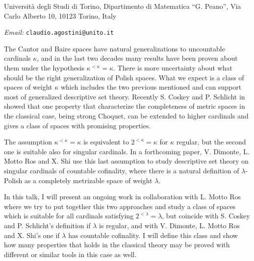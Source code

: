 \documentclass[a4paper]{amsart}
\theoremstyle{remark}
\begin{document}
\noindent 
Universit\`a degli Studi di Torino, Dipartimento di Matematica ``G. Peano'', Via Carlo Alberto 10, 10123 Torino, Italy

\noindent 
\emph{Email:} \texttt{claudio.agostini@unito.it} 


The Cantor and Baire spaces have natural generalizations to uncountable cardinals $\kappa$, and in the last two decades many results have been proven about them under the hypothesis $\kappa^{<\kappa}=\kappa$. There is more uncertainty about what should be the right generalization of Polish spaces. What we expect is a class of spaces of weight $\kappa$ which includes the two previous mentioned and can support most of generalized descriptive set theory.
Recently S. Coskey and P. Schlicht in \cite{CosSch} showed that one property that characterize the completeness of metric spaces in the classical case, being strong Choquet, can be extended to higher cardinals and gives a class of spaces with promising properties. 


The assumption $\kappa^{<\kappa}=\kappa$ is equivalent to $2^{<\kappa}=\kappa$ for $\kappa$ regular, but the second one is suitable also for singular cardinals. 
In a forthcoming paper, V. Dimonte, L. Motto Ros and X. Shi use this last assumption to study descriptive set theory on singular cardinals of countable cofinality, where there is a natural definition of $\lambda$-Polish as a completely metrizable space of weight $\lambda$. 

In this talk, I will present an ongoing work in collaboration with L. Motto Ros where we try to put together this two approaches and study a class of spaces which is suitable for all cardinals satisfying $2^{<\lambda}=\lambda$, but coincide with S. Coskey and P. Schlicht's definition if $\lambda$ is regular, and with V. Dimonte, L. Motto Ros and X. Shi's one if $\lambda$ has countable cofinality. I will define this class and show how many properties that holds in the classical theory may be proved with different or similar tools in this case as well.  

\smallskip 
\renewcommand{\section}[2]{}
\end{document}
